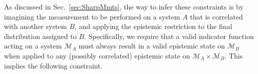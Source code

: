 \documentclass[pra,superscriptaddress,nofootinbib,12pt]{revtex4-2}
\begin{document}
As discussed in Sec.~\ref{sec:SharpMmts}, the way to infer these constraints is by imagining the measurement to be performed on a system $A$ that is correlated with another system $B$, and applying the epistemic restriction to the final distribution assigned to $B$.
Specifically, we require that a valid indicator
function acting on a system $\mathcal{M}_A$ must always result in a valid
epistemic state on $\mathcal{M}_B$ when applied to any (possibly correlated) epistemic state on
$\mathcal{M}_A \times \mathcal{M}_B$.  This implies the following constraint.
\end{document}
